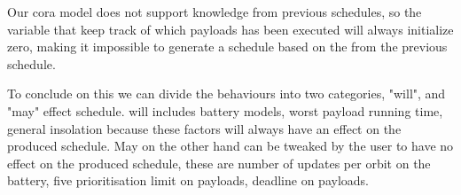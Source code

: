 Our \gls{cora} model does not support knowledge from previous schedules, so the variable  that keep track of which payloads has been executed will always initialize zero, making it impossible to generate a schedule based on the  from the previous schedule.

To conclude on this we can divide the behaviours into two categories, "will", and "may" effect schedule. will includes battery models, worst payload running time, general insolation because these factors will always have an effect on the produced schedule. May on the other hand can be tweaked by the user to have no effect on the produced schedule, these are number of updates per orbit on the battery, five prioritisation limit on payloads, deadline on payloads.



 






